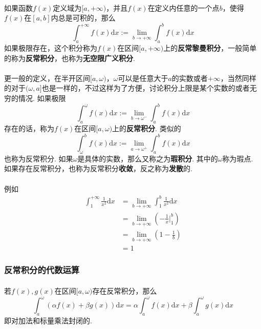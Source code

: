 \paragraph{}
如果函数$f(x)$定义域为$[a, +\infty)$，并且$f(x)$在定义内任意的一个点$b$，使得$f(x)$在$[a, b]$内总是可积的，那么
$$
\int_a^{+\infty} f(x) \mathrm{d} x := \lim_{b\to +\infty} \int_a^b f(x) \mathrm{d} x
$$
如果极限存在，这个积分称为$f(x)$在区间$[a, +\infty)$上的\textbf{反常黎曼积分}，一般简单的称为\textbf{反常积分}，也称为\textbf{无空限广义积分}. 

\paragraph{}
更一般的定义，在半开区间$[a, \omega)$，$\omega$可以是任意大于$a$的实数或者$+\infty$，当然同样的对于$(\omega, a]$也是一样的，不过这样为了方便，讨论积分上限是某个实数的或者无穷的情况. 如果极限
$$
\int_a^\omega f(x) \mathrm{d} x := \lim_{b \to \omega^-} \int_a^b f(x) \mathrm{d} x
$$
存在的话，称为$f(x)$在区间$[a, \omega)$上的\textbf{反常积分}.  类似的
$$
\int_\omega^b f(x) \mathrm{d} x := \lim_{a \to \omega^+} \int_a^b f(x) \mathrm{d} x
$$
也称为反常积分.  如果$\omega$是具体的实数，那么又称之为\textbf{瑕积分}. 其中的$\omega$称为瑕点. 如果存在反常积分，也称为反常积分\textbf{收敛}，反之称为\textbf{发散}的.

\paragraph{}
例如
\begin{align*}
\int_1^{+\infty} \frac{1}{x^2} \mathrm{d} x & = \lim_{b \to +\infty} \int_1^b \frac{1}{x^2} \mathrm{d} x \\
& = \lim_{b \to +\infty} (- \frac{1}{x}  |_1^b) \\
& =  \lim_{b \to +\infty} (1 - \frac{1}{b} ) \\
& = 1
\end{align*}

\subsubsection{反常积分的代数运算}
\paragraph{}
若$f(x), g(x)$在区间$[a, \omega)$存在反常积分，那么
$$
\int_a^\omega(\alpha  f(x) + \beta g(x)) \mathrm{d} x  =\alpha  \int_a^\omega f(x) \mathrm{d} x + \beta \int_a^\omega g(x) \mathrm{d} x
$$
即对加法和标量乘法封闭的.

